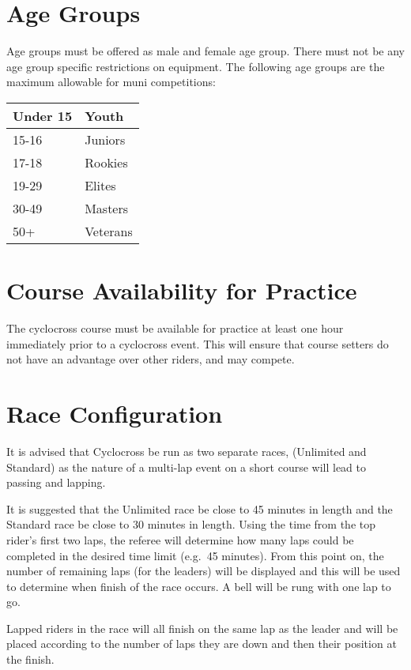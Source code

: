 \section{Age Groups}

Age groups must be offered as male and female age group.
There must not be any age group specific restrictions on equipment.
The following age groups are the maximum allowable for muni competitions:

\begin{tabular}{|l|l|}
\hline
Under 15 & Youth \\
\hline
15-16 & Juniors \\
\hline
17-18 & Rookies \\
\hline
19-29 & Elites \\
\hline
30-49 & Masters \\
\hline
50+ & Veterans \\
\hline
\end{tabular}

\section{Course Availability for Practice}

The cyclocross course must be available for practice at least one hour immediately prior to a cyclocross event.
This will ensure that course setters do not have an advantage over other riders, and may compete.

\section{Race Configuration}

It is advised that Cyclocross be run as two separate races, (Unlimited and Standard) as the nature of a multi-lap event on a short course will lead to passing and lapping.

It is suggested that the Unlimited race be close to 45 minutes in length and the Standard race be close to 30 minutes in length.
Using the time from the top rider's first two laps, the referee will determine how many laps could be completed in the desired time limit (e.g.\ 45 minutes).
From this point on, the number of remaining laps (for the leaders) will be displayed and this will be used to determine when finish of the race occurs.
A bell will be rung with one lap to go.

Lapped riders in the race will all finish on the same lap as the leader and will be placed according to the number of laps they are down and then their position at the finish.
